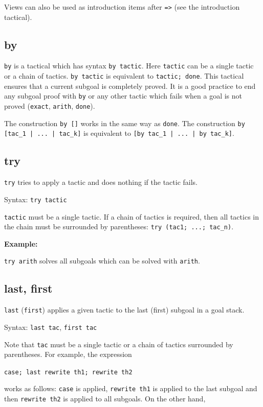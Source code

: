 \documentclass[a4paper]{article}
\begin{document}
Views can also be used as introduction items after \verb|=>| (see the introduction tactical).



\subsection{by}
\verb|by| is a tactical which has syntax \verb|by tactic|. Here \verb|tactic| can be a single tactic or a chain of tactics. \verb|by tactic| is equivalent to \verb|tactic; done|. This tactical ensures that a current subgoal is completely proved. It is a good practice to end any subgoal proof with \verb|by| or any other tactic which fails when a goal is not proved (\verb|exact|, \verb|arith|, \verb|done|).

The construction \verb|by []| works in the same way as \verb|done|. The construction \verb$by [tac_1 | ... | tac_k]$ is equivalent to \verb$[by tac_1 | ... | by tac_k]$.



\subsection{try}
\verb|try| tries to apply a tactic and does nothing if the tactic fails.

Syntax: \verb|try tactic|

\verb|tactic| must be a single tactic. If a chain of tactics is required, then all tactics in the chain must be surrounded by parentheses: \verb|try (tac1; ...; tac_n)|.

{\bf Example:}

\verb|try arith| solves all subgoals which can be solved with \verb|arith|.


\subsection{last, first}
\verb|last| (\verb|first|) applies a given tactic to the last (first) subgoal in a goal stack.

Syntax:
\verb|last tac|, \verb|first tac|

Note that \verb|tac| must be a single tactic or a chain of tactics surrounded by parentheses. For example, the expression 

\verb|case; last rewrite th1; rewrite th2| 

works as follows: \verb|case| is applied, \verb|rewrite th1| is applied to the last subgoal and then \verb|rewrite th2| is applied to all subgoals. On the other hand, 
\end{document}
